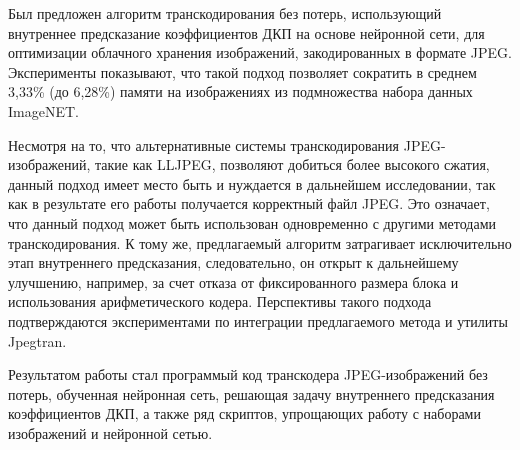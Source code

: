 \documentclass[times,specification,annotation]{itmo-student-thesis}
\begin{document}
Был предложен алгоритм транскодирования без потерь, использующий внутреннее предсказание коэффициентов ДКП на основе нейронной сети, для оптимизации облачного хранения изображений, закодированных в формате JPEG. Эксперименты показывают, что такой подход позволяет сократить в среднем 3,33\% (до 6,28\%) памяти на изображениях из подмножества набора данных ImageNET.\par

Несмотря на то, что альтернативные системы транскодирования JPEG-изображений, такие как LLJPEG, позволяют добиться более высокого сжатия, данный подход имеет место быть и нуждается в дальнейшем исследовании, так как в результате его работы получается корректный файл JPEG. Это означает, что данный подход может быть использован одновременно с другими методами транскодирования. К тому же, предлагаемый алгоритм затрагивает исключительно этап внутреннего предсказания, следовательно, он открыт к дальнейшему улучшению, например, за счет отказа от фиксированного размера блока и использования арифметического кодера. Перспективы такого подхода подтверждаются экспериментами по интеграции предлагаемого метода и утилиты Jpegtran.\par

Результатом работы стал программый код транскодера JPEG-изображений без потерь, обученная нейронная сеть, решающая задачу внутреннего предсказания коэффициентов ДКП, а также ряд скриптов, упрощающих работу с наборами изображений и нейронной сетью.\par

\printmainbibliography
\end{document}

